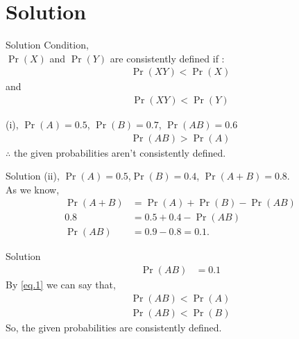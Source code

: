 \documentclass{beamer}
\providecommand{\pr}[1]{\ensuremath{\Pr\left(#1\right)}}
\providecommand{\pr}[1]{\ensuremath{\Pr\left(#1\right)}}
\begin{document}
\section{Solution}
	\begin{frame}{Solution}
Condition,\\
$\pr{X}$ and $\pr{Y}$ are consistently defined if :\\
\begin{align*}
\pr{XY} < \pr{X}
\end{align*}	
and
\begin{align*}
\pr{XY}< \pr{Y}
\end{align*}	
\end{frame}
%
\begin{frame}{}
(i), $\pr{A}=0.5$, $\pr{B}=0.7$, $\pr{AB}=0.6$
\begin{align*}
\pr{AB}>\pr{A}
\end{align*}
$\therefore$ the given probabilities aren't consistently defined.%
\end{frame}
%
\begin{frame}{Solution}
(ii), $\pr{A}=0.5$,$\pr{B}=0.4$, $\pr{A+B}=0.8$.\\[6pt]
As we know,
\begin{align*}
\pr{A+B} &= \pr{A} +\pr{B} - \pr{AB}\\
0.8 &= 0.5 + 0.4 - \pr{AB}\\
\pr{AB} &= 0.9-0.8 =0.1.
\end{align*}
\end{frame}
%
\begin{frame}{Solution}
\begin{align}
\pr{AB}&=0.1
\label{eq.1}
\end{align}
By \eqref{eq.1} we can say that,
\begin{align*}
\pr{AB}<\pr{A} \\
\pr{AB}<\pr{B}
\end{align*}
So, the given probabilities are consistently defined.\\[6pt]
\end{frame}
\end{document}

